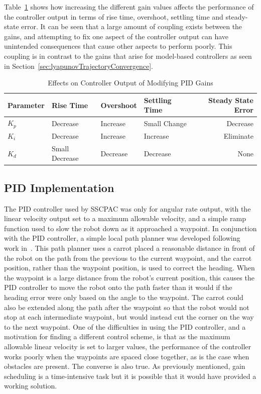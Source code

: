 Table~\ref{tab:PIDGainEffects} shows how increasing the different gain values affects the performance of the controller output in terms of rise time, overshoot, settling time and steady-state error. It can be seen that a large amount of coupling exists between the gains,  and attempting to fix one aspect of the controller output can have unintended consequences that cause other aspects to perform poorly. This coupling is in contrast to the gains that arise for model-based controllers as seen in Section~\ref{sec:lyapunovTrajectoryConvergence}.

\begin{table}[ht!]
\caption{Effects on Controller Output of Modifying PID Gains}
\small
\centering
\begin{tabular}{@{}llllr@{}} \toprule
Parameter    & Rise Time      & Overshoot & Settling Time & Steady State Error \\ \midrule
$K_p$        & Decrease       & Increase  & Small Change  & Decrease \\
$K_i$        & Decrease       & Increase  & Increase      & Eliminate \\
$K_d$        & Small Decrease & Decrease  & Decrease      & None \\ \bottomrule
\end{tabular}%
\label{tab:PIDGainEffects}
\end{table}

\subsection{PID Implementation}
The PID controller used by SSCPAC was only for angular rate output, with the linear velocity output set to a maximum allowable velocity, and a simple ramp function used to slow the robot down as it approached a waypoint. In conjunction with the PID controller, a simple local path planner was developed following work in~\cite{Hogg02}. This path planner uses a carrot placed a reasonable distance in front of the robot on the path from the previous to the current waypoint, and the carrot position, rather than the waypoint position, is used to correct the heading. When the waypoint is a large distance from the robot's current position, this causes the PID controller to move the robot onto the path faster than it would if the heading error were only based on the angle to the waypoint. The carrot could also be extended along the path after the waypoint so that the robot would not stop at each intermediate waypoint, but would instead cut the corner on the way to the next waypoint. One of the difficulties in using the PID controller, and a motivation for finding a different control scheme, is that as the maximum allowable linear velocity is set to larger values, the performance of the controller works poorly when the waypoints are spaced close together, as is the case when obstacles are present. The converse is also true. As previously mentioned, gain scheduling is a time-intensive task but it is possible that it would have provided a working solution.

